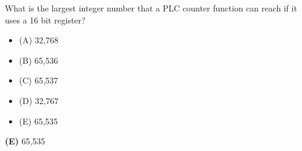

What is the largest integer number that a PLC counter function can reach if it uses a 16 bit register?

\begin{itemize}
\item{(A)} 32,768
\vskip 5pt 
\item{(B)} 65,536
\vskip 5pt 
\item{(C)} 65,537
\vskip 5pt 
\item{(D)} 32,767
\vskip 5pt 
\item{(E)} 65,535
\end{itemize}







{\bf (E)} 65,535
 










